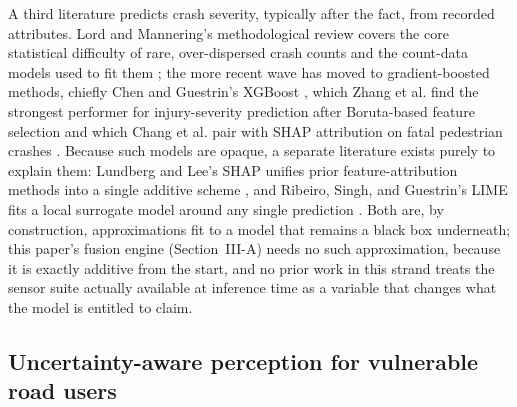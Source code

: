 \documentclass[journal]{IEEEtran}
\begin{document}
A third literature predicts crash severity, typically after the fact, from recorded attributes. Lord and Mannering's methodological review covers the core statistical difficulty of rare, over-dispersed crash counts and the count-data models used to fit them \cite{lord2010}; the more recent wave has moved to gradient-boosted methods, chiefly Chen and Guestrin's XGBoost \cite{chen2016}, which Zhang et al. find the strongest performer for injury-severity prediction after Boruta-based feature selection \cite{zhang2022} and which Chang et al. pair with SHAP attribution on fatal pedestrian crashes \cite{chang2022}. Because such models are opaque, a separate literature exists purely to explain them: Lundberg and Lee's SHAP unifies prior feature-attribution methods into a single additive scheme \cite{lundberg2017}, and Ribeiro, Singh, and Guestrin's LIME fits a local surrogate model around any single prediction \cite{ribeiro2016}. Both are, by construction, approximations fit to a model that remains a black box underneath; this paper's fusion engine (Section~III-A) needs no such approximation, because it is exactly additive from the start, and no prior work in this strand treats the sensor suite actually available at inference time as a variable that changes what the model is entitled to claim.

\subsection{Uncertainty-aware perception for vulnerable road users}
\end{document}
